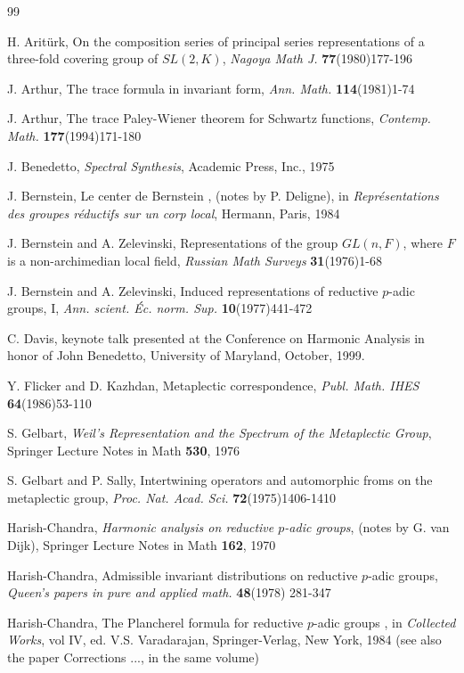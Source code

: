 \documentclass[12pt,letterpaper]{article}
\theoremstyle{definition}
\theoremstyle{remark}
\newcommand{\verify}[1]{\textit{[verification pending: #1]}}
\begin{document}
\begin{thebibliography}{99}

 H. Arit\"urk, 
 On the composition series of principal series
representations of a three-fold covering group of $SL(2,K)$,  
{\it Nagoya Math J.} {\bf 77}(1980)177-196 %

 J. Arthur, 
 The trace formula in invariant form, {\it  Ann. Math.}
{\bf 114}(1981)1-74

 J. Arthur, 
 The trace Paley-Wiener theorem for Schwartz functions, 
{\it Contemp. Math.} {\bf 177}(1994)171-180

 J. Benedetto, {\it Spectral Synthesis}, 
Academic Press, Inc., 1975

 J. Bernstein, 
 Le center de Bernstein , (notes by P. Deligne), 
in {\it Repr\'esentations des 
groupes r\'eductifs sur un corp local},
Hermann, Paris, 1984

 J. Bernstein and A. Zelevinski,
 Representations of 
the group $GL(n,F)$, where $F$ is a non-archimedian local field, 
{\it Russian Math Surveys} {\bf 31}(1976)1-68

 J. Bernstein and A. Zelevinski,
 Induced representations of reductive $p$-adic 
groups, I,  {\it Ann. scient. \'Ec. norm. Sup.} {\bf 10}(1977)441-472

 C. Davis, keynote talk presented at the
Conference on Harmonic Analysis in honor
of John Benedetto, University of Maryland,
October, 1999. 

 Y. Flicker and D. Kazhdan, 
 Metaplectic correspondence,  
{\it Publ. Math. IHES} {\bf 64}(1986)53-110

 S. Gelbart, 
{\it Weil's Representation and the 
Spectrum of the Metaplectic Group},
Springer Lecture Notes in Math {\bf 530}, 1976

 S. Gelbart and P. Sally, 
 Intertwining operators and 
automorphic froms on the metaplectic group,  
{\it Proc. Nat. Acad. Sci.}
{\bf 72}(1975)1406-1410

 Harish-Chandra, {\it Harmonic analysis
on reductive $p$-adic groups},
(notes by G. van Dijk), 
Springer Lecture Notes in Math {\bf 162}, 1970

 Harish-Chandra,
 Admissible invariant distributions on reductive $p$-adic groups, 
{\it Queen's papers in pure and applied math.} {\bf 48}(1978)
281-347

 Harish-Chandra,
 The Plancherel formula for reductive $p$-adic groups ,
in {\it Collected Works}, vol IV, ed. V.S. Varadarajan,
Springer-Verlag, New York, 1984 (see also the paper
 Corrections ..., in the same volume)


\end{thebibliography}
\end{document}

